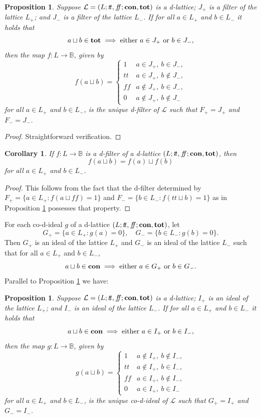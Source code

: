 \documentclass[11pt]{article}
\theoremstyle{plain}
\newtheorem{prop}[thm]{Proposition}
\newtheorem{cor}[thm]{Corollary}
\theoremstyle{definition}
\newcommand{\bbB}{\mathbb{B}}
\newcommand{\dbt}{{t\!t}}
\newcommand{\dbf}{{f\!\!f}}
\newcommand{\lra}{\longrightarrow}
\begin{document}
\begin{prop} \label{structure of d-filter} Suppose $\mathcal{L}=(L;\dbt,\dbf;{\bf con},{\bf tot})$ is a d-lattice;   $J_+$ is a filter of the lattice $L_+$; and $J_-$ is a filter of the lattice $L_-$.  If for all $a\in L_+$ and $b\in L_-$ it holds that  $$ a\sqcup b\in{\bf tot}\implies \text{either $a\in J_+$ or $b\in J_-$},$$  then the map $f\colon L\lra\mathbb{B}$, given by  $$f(a\sqcup b)= \begin{cases}1 & a\in J_+,~b\in J_-,\\
\dbt & a\in J_+,~b\notin J_-,\\ 
\dbf & a\notin J_+,~b\in J_-,\\
0 &a\notin J_+,~b\notin J_- \end{cases}$$ for all $a\in L_+$ and $b\in L_-$, is the unique d-filter of $\mathcal{L}$ such that  $F_+=J_+$ and $F_-=J_-$. \end{prop}

\begin{proof} Straightforward verification. \end{proof}

\begin{cor}\label{proper d-filter} If $f\colon L\lra \bbB$ is a d-filter of a d-lattice $(L;\dbt,\dbf;{\bf con},{\bf tot})$,   then  $$f(a\sqcup b)=f(a)\sqcup f(b)$$ for all $a\in L_{+}$ and $b\in L_{-}$.    \end{cor}

\begin{proof} This follows from the fact that the d-filter determined by $F_+=\{a\in L_+:f(a\sqcup\dbf)=1\}$ and $F_-=\{b\in L_-:f(\dbt\sqcup b)=1\}$ as in Proposition \ref{structure of d-filter}  possesses that property.
 \end{proof}
 
For each co-d-ideal $g$ of a d-lattice $(L;\dbt,\dbf;{\bf con},{\bf tot})$, let $$ G_+=\{a\in L_+:g(a)=0\},\quad G_-=\{b\in L_-:g(b)=0\}.$$  Then  $G_+$ is an ideal of the lattice $L_+$ and $G_-$ is an ideal of the lattice $L_-$ such that  for all $a\in L_+$ and $b\in L_-$,  $$ a\sqcup b\in{\bf con}\implies \text{either $a\in G_+$ or $b\in G_-$}. $$ Parallel to Proposition \ref{structure of d-filter} we have: 

\begin{prop} \label{structure of d-ideal} Suppose $\mathcal{L}=(L;\dbt,\dbf;{\bf con},{\bf tot})$ is a d-lattice;  $I_+$ is an ideal of the lattice $L_+$; and $I_-$ is an ideal of the lattice $L_-$. If for all $a\in L_+$ and $b\in L_-$ it holds that  $$ a\sqcup b\in{\bf con}\implies \text{either $a\in I_+$ or $b\in I_-$}, $$ then the map $g\colon L\lra\mathbb{B}$, given by  $$g(a\sqcup b)  =\begin{cases} 1 & a\notin I_+,~b\notin I_-,\\
\dbt & a\notin I_+,~b\in I_-,\\ 
\dbf & a\in I_+,~b\notin I_-,\\
0 & a\in I_+,~b\in I_- \end{cases}$$  for all $a\in L_+$ and $b\in L_-$, is the unique co-d-ideal of $\mathcal{L}$ such that $G_+=I_+$ and $G_-=I_-$.  \end{prop}
  
\end{document}
